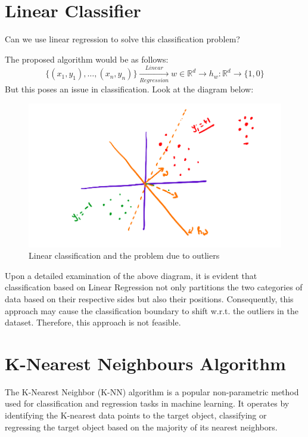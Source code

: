 \documentclass[
]{article}
\begin{document}
\hypertarget{linear-classifier}{%
\section{Linear Classifier}\label{linear-classifier}}

Can we use linear regression to solve this classification problem?

The proposed algorithm would be as follows: \[
\{(x_1, y_1), \ldots, (x_n,y_n)\} \xrightarrow[Regression]{Linear} w \in \mathbb{R}^d\rightarrow h_w: \mathbb{R}^d \rightarrow \{1, 0\}
\] But this poses an issue in classification. Look at the diagram below:

\begin{figure}
\centering
\includegraphics{../images/lin_class.png}
\caption{Linear classification and the problem due to outliers}
\end{figure}

Upon a detailed examination of the above diagram, it is evident that
classification based on Linear Regression not only partitions the two
categories of data based on their respective sides but also their
positions. Consequently, this approach may cause the classification
boundary to shift w.r.t. the outliers in the dataset. Therefore, this
approach is not feasible.

\hypertarget{k-nearest-neighbours-algorithm}{%
\section{K-Nearest Neighbours
Algorithm}\label{k-nearest-neighbours-algorithm}}

The K-Nearest Neighbor (K-NN) algorithm is a popular non-parametric
method used for classification and regression tasks in machine learning.
It operates by identifying the K-nearest data points to the target
object, classifying or regressing the target object based on the
majority of its nearest neighbors.
\end{document}
